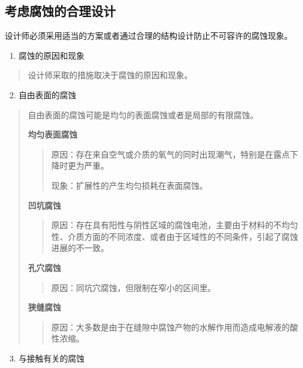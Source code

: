 \documentclass[letterpaper,10pt,english]{sphinxmanual}
\begin{document}
\subsection{考虑腐蚀的合理设计}
\label{unit6:id17}
设计师必须采用适当的方案或者通过合理的结构设计防止不可容许的腐蚀现象。
\begin{enumerate}
\item {} 
腐蚀的原因和现象

\end{enumerate}
\begin{quote}

设计师采取的措施取决于腐蚀的原因和现象。
\end{quote}
\begin{enumerate}
\setcounter{enumi}{1}
\item {} 
自由表面的腐蚀

\end{enumerate}
\begin{quote}

自由表面的腐蚀可能是均匀的表面腐蚀或者是局部的有限腐蚀。

\textbf{均匀表面腐蚀}
\begin{quote}

原因：存在来自空气或介质的氧气的同时出现潮气，特别是在露点下降时更为严重。

现象：扩展性的产生均匀损耗在表面腐蚀。
\end{quote}

\textbf{凹坑腐蚀}
\begin{quote}

原因：存在具有阳性与阴性区域的腐蚀电池，主要由于材料的不均匀性、介质方面的不同浓度、或者由于区域性的不同条件，引起了腐蚀进展的不一致。
\end{quote}

\textbf{孔穴腐蚀}
\begin{quote}

原因：同坑穴腐蚀，但限制在窄小的区间里。
\end{quote}

\textbf{狭缝腐蚀}
\begin{quote}

原因：大多数是由于在缝隙中腐蚀产物的水解作用而造成电解液的酸性浓缩。
\end{quote}
\end{quote}
\begin{enumerate}
\setcounter{enumi}{2}
\item {} 
与接触有关的腐蚀

\end{enumerate}
\end{document}
